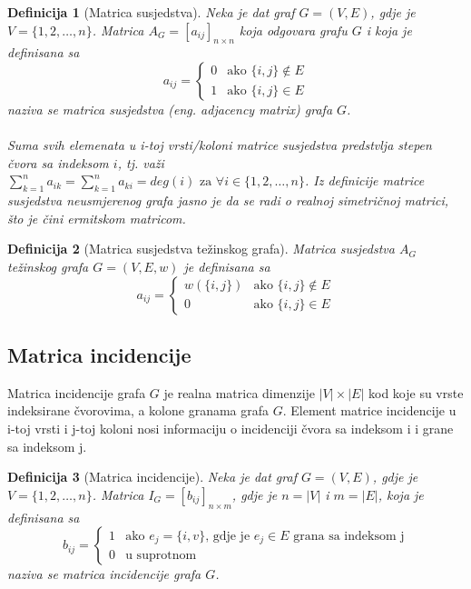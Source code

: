 \documentclass[11pt]{article}
\newtheorem{definition}{Definicija}
\begin{document}
			\begin{definition}[Matrica susjedstva] 
			Neka je dat graf $G = (V, E)$, gdje je $V = \{1, 2, \dots, n\}$. Matrica $A_G = [a_{ij}]_{n \times n}$ koja odgovara grafu $G$ i koja je definisana sa
			 \[
				 a_{ij} =
				 \begin{cases} 
				 0 & \text{ako } \{i, j\} \notin E \\ 
				 1 & \text{ako } \{i, j\} \in E
				 \end{cases}
			 \]
			naziva se matrica susjedstva (eng. adjacency matrix) grafa $G$.
				\paragraph{}
				Suma svih elemenata u i-toj vrsti/koloni matrice susjedstva predstvlja stepen čvora sa indeksom $i$,
				tj. važi $\sum_{k=1}^{n}a_{ik} = \sum_{k=1}^{n}a_{ki} = deg(i) \text{ za } \forall i \in \{1,2, \dots, n\}$.
				Iz definicije matrice susjedstva neusmjerenog grafa jasno je da se radi o realnoj simetričnoj matrici, što je čini ermitskom matricom. 
			\end{definition}
	
			\begin{definition}[Matrica susjedstva težinskog grafa] 
			Matrica susjedstva $A_G$ težinskog grafa  $G = (V, E, w)$ je definisana sa
			\[
				a_{ij} =
				\begin{cases} 
				w(\{i,j\}) & \text{ako } \{i, j\} \notin E \\ 
				0 & \text{ako } \{i, j\} \in E
				\end{cases}
			\]
			\end{definition}
	
		\subsection{Matrica incidencije}
		Matrica incidencije grafa $G$ je realna matrica dimenzije $|V| \times |E|$ kod koje su vrste indeksirane čvorovima, a kolone granama grafa $G$.
		Element matrice incidencije u i-toj vrsti i j-toj koloni nosi informaciju o incidenciji čvora sa indeksom i i grane sa indeksom j.
	
			\begin{definition}[Matrica incidencije] 
			Neka je dat graf $G = (V, E)$, gdje je $V = \{1, 2, \dots, n\}$. Matrica $I_G = [b_{ij}]_{n \times m}$, gdje je $n = |V|$ i $m = |E|$, koja je definisana sa
			 \[
				 b_{ij} =
				 \begin{cases}
				 1 & \text{ako } e_j = \{i,v\} \text{, gdje je } e_j \in E \text{ grana sa indeksom j} \\
				 0 & \text{u suprotnom}
				 \end{cases}
			 \]
			naziva se matrica incidencije grafa $G$.
			\end{definition}
	
\end{document}
